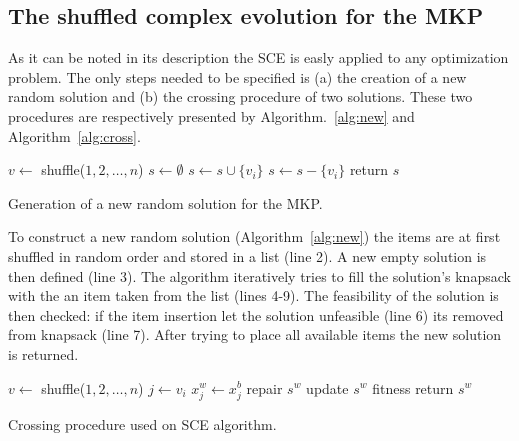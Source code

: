 \subsection{The shuffled complex evolution for the MKP}

As it can be noted in its description the SCE is easly applied to any
optimization problem.
The only steps needed to be specified is (a) the creation of a new random
solution and (b) the crossing procedure of two solutions.
These two procedures are respectively presented by Algorithm.~\ref{alg:new} and
Algorithm~\ref{alg:cross}.

\begin{algorithm}
\begin{algorithmic}[1]
    \State $v \leftarrow $ shuffle($1, 2, \ldots, n$)
	\State $s \leftarrow \emptyset$ 
	  \State $s \leftarrow s \cup \{v_i\}$ 
	   
	    \State $s \leftarrow s - \{v_i\}$
      \EndIf
	\EndFor
  \State return $s$
  \EndProcedure
\end{algorithmic}
\caption{Generation of a new random solution for the MKP.}
\label{alg:new}
\end{algorithm}

To construct a new random solution (Algorithm~\ref{alg:new}) the items are
at first shuffled in random order and stored in a list (line 2).
A new empty solution is then defined (line 3).
The algorithm iteratively tries to fill the solution's knapsack with 
the an item taken from the list (lines 4-9).
The feasibility of the solution is then checked: if the item insertion let
the solution unfeasible (line 6) its removed from knapsack (line 7).
After trying to place all available items the new solution is returned.

\begin{algorithm}
\begin{algorithmic}[1]
    \State $v \leftarrow $ shuffle($1, 2, \ldots, n$)
	  \State $j \leftarrow v_i$
	  \State $x^w_j \leftarrow x^b_j$ 
	\EndFor
	  \State repair $s^w$
	\EndIf
	\State update $s^w$ fitness
  \State return $s^w$
  \EndProcedure
\end{algorithmic}
\caption{Crossing procedure used on SCE algorithm.}
\label{alg:cross}
\end{algorithm}

